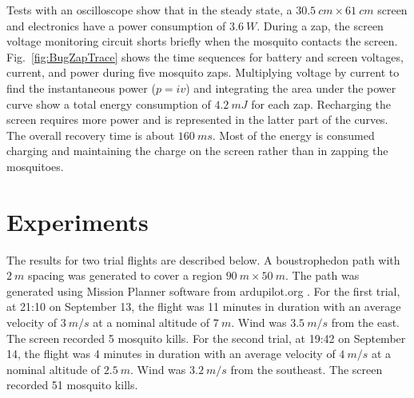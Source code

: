 \documentclass[letterpaper, 10 pt, conference]{ieeeconf}  %
\begin{document}
  
  Tests with an oscilloscope show that in the steady state, a $30.5~cm \times 61~cm$ screen and electronics have a power consumption of $3.6~ W$.  During a zap, the screen voltage monitoring circuit shorts briefly when the mosquito contacts the screen.  Fig.~\ref{fig:BugZapTrace} shows the time sequences for battery and screen voltages, current, and power during five mosquito zaps.  
 Multiplying voltage by current to find the instantaneous power ($p=iv$) and integrating the area under the power curve show a total energy consumption of $4.2~mJ$ for each zap.  Recharging the screen requires more power and is represented in the latter part of the curves.  The overall recovery time is about $160~ms$.  Most of the energy is consumed charging and maintaining the charge on the screen rather than in zapping the mosquitoes.
  
  



%
%    
    
    \section{Experiments}\label{sec:Experiments}
    
The results for two trial flights are described below. 
A boustrophedon path with $2~m$ spacing was generated to cover a 
region $90~m \times 50~m$. The path was generated using Mission Planner software from ardupilot.org \cite{Ardupilot}.
For the first trial, at 21:10 on September 13, the flight was 11 minutes in duration with an average velocity of $3~m/s$ at a nominal altitude of $7~m$.  Wind was $3.5~m/s$ from the east. The screen recorded 5 mosquito kills. 
For the second trial, at 19:42 on September 14, the flight was 4 minutes in duration with an average velocity of $4~m/s$ at a nominal altitude of $2.5~m$. Wind was $3.2~m/s$ from the southeast.
The screen recorded 51 mosquito kills. 
\end{document}
